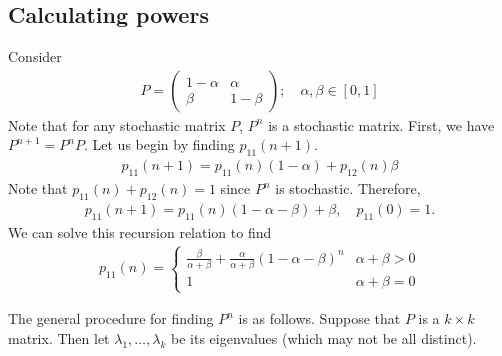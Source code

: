 \subsection{Calculating powers}
\begin{example}
	Consider
	\begin{align*}
		P = \begin{pmatrix}
			1-\alpha & \alpha \\ \beta & 1-\beta
		\end{pmatrix};\quad \alpha, \beta \in [0,1]
	\end{align*}
	Note that for any stochastic matrix $P$, $P^n$ is a stochastic matrix.
	First, we have $P^{n+1} = P^n P$.
	Let us begin by finding $p_{11}(n+1)$.
	\begin{align*}
		p_{11}(n+1) = p_{11}(n)(1-\alpha) + p_{12}(n)\beta
	\end{align*}
	Note that $p_{11}(n) + p_{12}(n) = 1$ since $P^n$ is stochastic.
	Therefore,
	\begin{align*}
		p_{11}(n+1) = p_{11}(n)(1-\alpha-\beta) + \beta,\quad p_{11}(0) = 1.
	\end{align*}
	We can solve this recursion relation to find
	\begin{align*}
		p_{11}(n) = \begin{cases}
			\frac{\beta}{\alpha + \beta} + \frac{\alpha}{\alpha + \beta}(1-\alpha-\beta)^n & \alpha + \beta > 0 \\
			1 & \alpha + \beta = 0\end{cases}
	\end{align*}
\end{example}
\noindent The general procedure for finding $P^n$ is as follows.
Suppose that $P$ is a $k \times k$ matrix.
Then let $\lambda_1, \dots, \lambda_k$ be its eigenvalues (which may not be all distinct).
